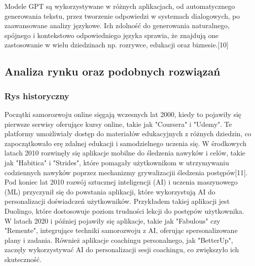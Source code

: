 \begin{enumerate}
    Modele GPT są wykorzystywane w różnych aplikacjach, od automatycznego generowania tekstu, przez tworzenie odpowiedzi w systemach dialogowych, po zaawansowane analizy językowe. Ich zdolność do generowania naturalnego, spójnego i kontekstowo odpowiedniego języka sprawia, że znajdują one zastosowanie w wielu dziedzinach np. rozrywce, edukacji oraz biznesie.[10]
    \\
     
 \end{enumerate}
\subsection{Analiza rynku oraz podobnych rozwiązań}

\subsubsection{Rys historyczny}
Początki samorozwoju online sięgają wczesnych lat 2000, kiedy to pojawiły się pierwsze serwisy oferujące kursy online, takie jak "Coursera" i "Udemy". Te platformy umożliwiały dostęp do materiałów edukacyjnych z różnych dziedzin, co zapoczątkowało erę zdalnej edukacji i samodzielnego uczenia się. W środkowych latach 2010 rozwinęły się aplikacje mobilne do śledzenia nawyków i celów, takie jak "Habitica" i "Strides", które pomagały użytkownikom w utrzymywaniu codziennych nawyków poprzez mechanizmy grywalizacji\linebreak i śledzenia postępów[11].
Pod koniec lat 2010 rozwój sztucznej inteligencji (AI) i uczenia maszynowego (ML) przyczynił się do powstania aplikacji, które wykorzystują AI do personalizacji doświadczeń użytkowników. Przykładem takiej aplikacji jest Duolingo, które dostosowuje poziom trudności lekcji do postępów użytkownika. W latach 2020 i później pojawiły się aplikacje, takie jak "Fabulous" czy "Remente", integrujące techniki samorozwoju z AI, oferując spersonalizowane plany i zadania. Również aplikacje coachingu personalnego, jak "BetterUp", zaczęły wykorzystywać AI do personalizacji sesji coachingu, co zwiększyło ich skuteczność.


